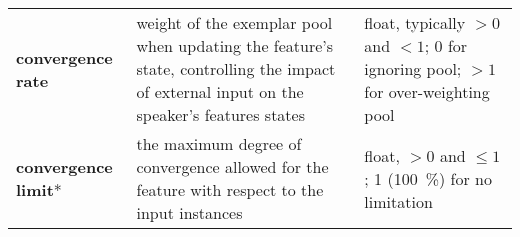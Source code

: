 \begin{landscape}
\begin{table}[tb]
\begin{tabulary}{\linewidth}{lLL}
			{\color{RoyalBlue}\textbf{convergence rate}}
			& weight of the exemplar pool when updating the feature's state, controlling the impact of external input on the speaker's features states
			& float, typically $> 0$ and $< 1$; 0 for ignoring pool; $> 1$ for over-weighting pool\\\addlinespace[0.2cm]
			
			{\color{red}\textbf{convergence limit}}*
			& the maximum degree of convergence allowed for the feature with respect to the input instances
			& float, $> 0$ and $\leq 1$; 1 (\SI{100}{\percent}) for no limitation \\
			\bottomrule
		\end{tabulary}
	\end{table}
\end{landscape}